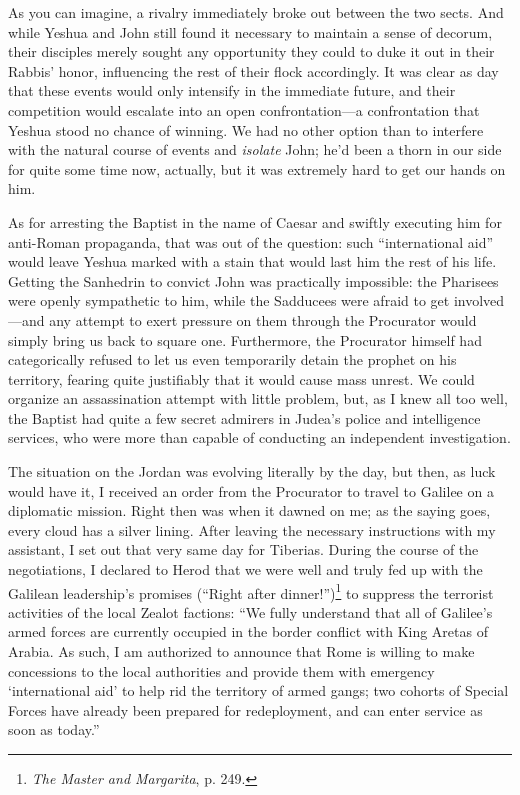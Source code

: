 As you can imagine, a rivalry immediately broke out between the two sects. And while Yeshua and John still found it necessary to maintain a sense of decorum, their disciples merely sought any opportunity they could to duke it out in their Rabbis' honor, influencing the rest of their flock accordingly. It was clear as day that these events would only intensify in the immediate future, and their competition would escalate into an open confrontation---a confrontation that Yeshua stood no chance of winning. We had no other option than to interfere with the natural course of events and \emph{isolate} John; he'd been a thorn in our side for quite some time now, actually, but it was extremely hard to get our hands on him.

As for arresting the Baptist in the name of Caesar and swiftly executing him for anti-Roman propaganda, that was out of the question: such ``international aid'' would leave Yeshua marked with a stain that would last him the rest of his life. Getting the Sanhedrin to convict John was practically impossible: the Pharisees were openly sympathetic to him, while the Sadducees were afraid to get involved---and any attempt to exert pressure on them through the Procurator would simply bring us back to square one. Furthermore, the Procurator himself had categorically refused to let us even temporarily detain the prophet on his territory, fearing quite justifiably that it would cause mass unrest. We could organize an assassination attempt with little problem, but, as I knew all too well, the Baptist had quite a few secret admirers in Judea's police and intelligence services, who were more than capable of conducting an independent investigation. 

The situation on the Jordan was evolving literally by the day, but then, as luck would have it, I received an order from the Procurator to travel to Galilee on a diplomatic mission. Right then was when it dawned on me; as the saying goes, every cloud has a silver lining. After leaving the necessary instructions with my assistant, I set out that very same day for Tiberias. During the course of the negotiations, I declared to Herod that we were well and truly fed up with the Galilean leadership's promises (``Right after dinner!'')\footnote{\emph{The Master and Margarita}, p. 249.} to suppress the terrorist activities of the local Zealot factions: ``We fully understand that all of Galilee's armed forces are currently occupied in the border conflict with King Aretas of Arabia. As such, I am authorized to announce that Rome is willing to make concessions to the local authorities and provide them with emergency `international aid' to help rid the territory of armed gangs; two cohorts of Special Forces have already been prepared for redeployment, and can enter service as soon as today.''

